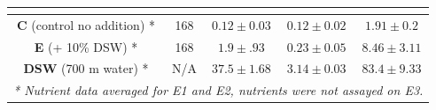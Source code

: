 \begin{table}[h!]
\begin{tabular}{ccccc}
\multicolumn{1}{|c|}{}                                    & \multicolumn{1}{c|}{}                                                        & \multicolumn{1}{c|}{}                                                                                    & \multicolumn{1}{c|}{}                                                                              & \multicolumn{1}{c|}{}                                                                            \\ \hline
\multicolumn{1}{|c|}{\textbf{C} (control no addition) *}  & \multicolumn{1}{c|}{168}                                                     & \multicolumn{1}{c|}{$0.12 \pm 0.03$}                                                                         & \multicolumn{1}{c|}{$0.12 \pm 0.02$}                                                                   & \multicolumn{1}{c|}{$1.91 \pm 0.2$}                                                                  \\ \hline
\multicolumn{1}{|c|}{\textbf{E} (+ 10\% DSW) *}           & \multicolumn{1}{c|}{168}                                                     & \multicolumn{1}{c|}{$1.9 \pm  .93$}                                                                          & \multicolumn{1}{c|}{$0.23 \pm 0.05$}                                                                   & \multicolumn{1}{c|}{$8.46 \pm 3.11$}                                                                 \\ \hline
\multicolumn{1}{|c|}{\textbf{DSW} (700 m water) *}        & \multicolumn{1}{c|}{N/A}                                                     & \multicolumn{1}{c|}{$37.5 \pm 1.68$}                                                                         & \multicolumn{1}{c|}{$3.14 \pm 0.03$}                                                                   & \multicolumn{1}{c|}{$83.4 \pm 9.33$}                                                                 \\ \hline
\multicolumn{5}{l}{\textit{* Nutrient data averaged for E1 and E2, nutrients were not assayed on E3.}}                                                                                                                                                                                                                                                                                                                                                     
\end{tabular}
\end{table}

